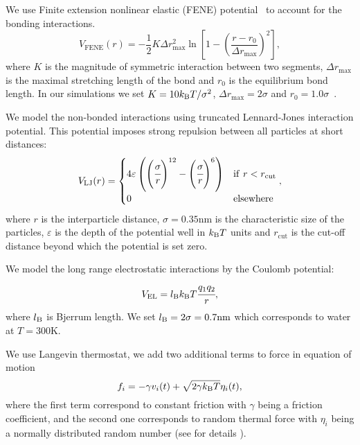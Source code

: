 \documentclass{elsarticle}
\begin{document}
We use Finite extension nonlinear elastic (FENE) potential~ to account for the bonding interactions.
\begin{equation}\label{eq:fene}
    V_\mathrm{FENE}(r) = -\frac{1}{2} K \Delta r_\mathrm{max}^2\ln \left[ 1 - \left(\frac{r-r_0}{\Delta r_\mathrm{max}} \right)^2 \right ],
\end{equation}
where $K$ is the magnitude of symmetric interaction between two segments,
$\Delta r_{\mathrm{max}}$ is the maximal stretching length of the bond and $r_0$ is the equilibrium bond length.
In our simulations we set $K = 10 k_\mathrm{B}T/\sigma^{2}$, $\Delta r_{\mathrm{max}} = 2 \sigma$ and $r_0 = 1.0\sigma$~\cite{Jin2007}.

We model the non-bonded interactions using truncated Lennard-Jones interaction potential.
This potential imposes strong repulsion between all particles at short distances:
\begin{equation}
    \begin{split}\label{eq:LJ}
        V_\mathrm{LJ}(r) =
        \begin{cases}
            4 \varepsilon \left( \left(\cfrac{\sigma}{r}\right)^{12}
            - \left(\cfrac{\sigma}{r}\right)^6\right)
            & \mathrm{if~} r < r_\mathrm{cut}\\
            0
            & \mathrm{elsewhere}
        \end{cases},
    \end{split}
\end{equation}
where $r$ is the interparticle distance,
$\sigma = 0.35 \mathrm{nm}$ is the characteristic size of the particles,
$\varepsilon$ is the depth of the potential well in $k_\mathrm{B}T$ units and $r_\mathrm{cut}$ is the cut-off distance beyond which the potential is set zero.

We model the long range electrostatic interactions by the Coulomb potential:
\begin{equation}
    V_{\mathrm{EL}}=l_\mathrm{B}k_\mathrm{B}T \cfrac{q_{1}q_{2}}{r},
\end{equation}
where $l_\mathrm{B}$ is Bjerrum length. We set $l_\mathrm{B} = 2\sigma = 0.7 \mathrm{nm}$ which corresponds to water at $T=300 \mathrm{K}$.


We use Langevin thermostat, \ie
we add two additional terms to force in equation of motion
\begin{equation}
f_i =  -\gamma v_i(t)+\sqrt{2\gamma k_\mathrm{B}T }\eta_i(t),
\end{equation}
where the first term correspond to constant friction with $\gamma$ being a friction coefficient, and the second one corresponds to random thermal force with $\eta_i$ being a normally distributed random number (see for details \cite{Grest1986}).
\end{document}

